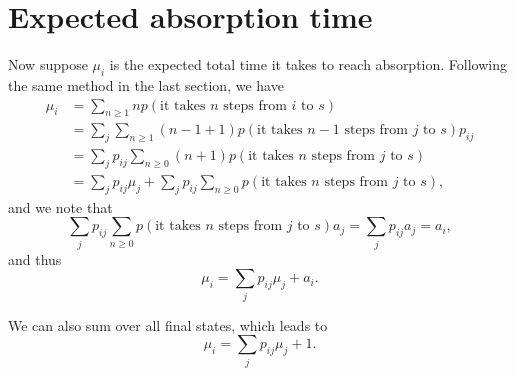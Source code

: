 \documentclass[hyperref, a4paper]{article}
\begin{document}
\section{Expected absorption time}

Now suppose $\mu_i$ is the expected total time it takes to reach absorption.
Following the same method in the last section, we have 
\[
    \begin{aligned}
        \mu_i &= \sum_{n \geq 1} n p(\text{it takes $n$ steps from $i$ to $s$}) \\
        &= \sum_j \sum_{n \geq 1} (n - 1 + 1) p(\text{it takes $n-1$ steps from $j$ to $s$}) p_{ij} \\
        &= \sum_{j} p_{ij} \sum_{n \geq 0} (n + 1) p(\text{it takes $n$ steps from $j$ to $s$}) \\
        &= \sum_j p_{ij} \mu_j + \sum_j p_{ij} \sum_{n \geq 0}  p(\text{it takes $n$ steps from $j$ to $s$}) ,
    \end{aligned}
\]
and we note that 
\[
    \sum_{j} p_{ij} \sum_{n \geq 0}  p(\text{it takes $n$ steps from $j$ to $s$}) a_j = \sum_{j} p_{ij} a_j = a_i,
\]
and thus 
\begin{equation}
    \mu_i = \sum_j p_{ij} \mu_j + a_i.
\end{equation}

We can also sum over all final states, which leads to 
\begin{equation}
    \mu_i = \sum_{j} p_{ij} \mu_j + 1.
\end{equation}
\end{document}

